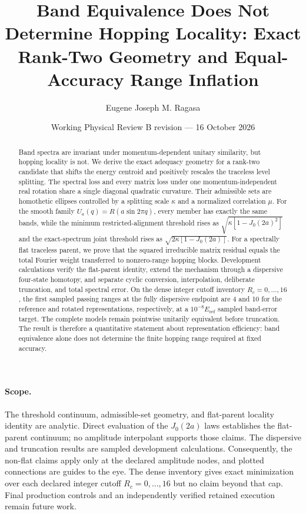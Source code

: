 \documentclass[aps,prb,reprint,amsmath,amssymb,longbibliography,floatfix]{revtex4-2}
\begin{document}
\title{Band Equivalence Does Not Determine Hopping Locality:
Exact Rank-Two Geometry and Equal-Accuracy Range Inflation}
\author{Eugene Joseph M. Ragasa}
\date{Working Physical Review B revision --- 16 October 2026}

\begin{abstract}
Band spectra are invariant under momentum-dependent unitary similarity, but hopping
locality is not. We derive the exact adequacy geometry for a rank-two candidate that
shifts the energy centroid and positively rescales the traceless level splitting. The
spectral loss and every matrix loss under one momentum-independent real rotation share a
single diagonal quadratic curvature. Their admissible sets are homothetic ellipses
controlled by a splitting scale $\kappa$ and a normalized correlation $\mu$. For the
smooth family $U_a(q)=R(a\sin2\pi q)$, every member has exactly the same bands, while the
minimum restricted-alignment threshold rises as
$\sqrt{\kappa[1-J_0(2a)^2]}$ and the exact-spectrum joint threshold rises as
$\sqrt{2\kappa[1-J_0(2a)]}$. For a spectrally flat traceless parent, we prove that the
squared irreducible matrix residual equals the total Fourier weight transferred to
nonzero-range hopping blocks. Development calculations verify the flat-parent identity,
extend the mechanism through a dispersive four-state homotopy, and separate cyclic
conversion, interpolation, deliberate truncation, and total spectral error. On the dense integer
cutoff inventory $R_c=0,\ldots,16$, the first sampled passing ranges at the fully
dispersive endpoint are 4 and 10 for the reference and rotated representations,
respectively, at a $10^{-8}E_{\mathrm{ref}}$ sampled band-error target. The complete models remain pointwise unitarily equivalent before
truncation. The result is therefore a quantitative statement about representation
efficiency: band equivalence alone does not determine the finite hopping range required
at fixed accuracy.
\end{abstract}
\maketitle

\paragraph{Scope.}
The threshold continuum, admissible-set geometry, and flat-parent locality identity are
analytic. Direct evaluation of the $J_0(2a)$ laws establishes the flat-parent continuum;
no amplitude interpolant supports those claims. The dispersive and truncation results
are sampled development calculations. Consequently, the non-flat claims apply only at
the declared amplitude nodes, and plotted connections are guides to the eye. The dense
inventory gives exact minimization over each declared integer cutoff
$R_c=0,\ldots,16$ but no claim beyond that cap. Final production controls and an
independently verified retained execution remain future work.
\end{document}
